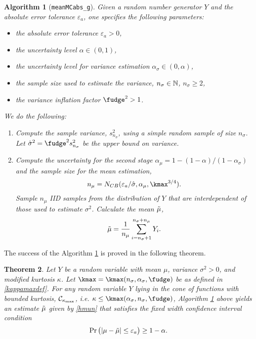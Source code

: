 \documentclass{iitthesis}
\newtheorem{theorem}{Theorem}[section]
\newtheorem{algorithm}[theorem]{Algorithm}
\begin{document}
\begin{algorithm}[{\tt meanMCabs\_g}]\label{meanMCabsg}
Given a random number generator $Y$ and the absolute error tolerance $\varepsilon_a$, one specifies the following parameters:
\begin{itemize}
\item the absolute error tolerance $\varepsilon_a >0$,
\item the uncertainty level $\alpha \in (0,1)$,
\item the uncertainty level for variance estimation $\alpha_\sigma \in (0,\alpha)$,
\item the sample size used to estimate the variance, $n_{\sigma} \in \mathbb{N}$, $n_{\sigma} \geq 2$,
\item the variance inflation factor $\fudge^2 >1$.
\end{itemize}
We do the following:
\begin{enumerate}
\item Compute the sample variance, $s^2_{n_{\sigma}}$, using a simple random sample of size $n_\sigma$. Let $\hsigma^2 = \fudge^2 s^2_{n_\sigma}$ be the upper bound on variance.
\item Compute the uncertainty for the second stage $\alpha_\mu = 1-(1-\alpha)/(1-\alpha_{\sigma})$ and the sample size for the mean estimation,
\begin{align}\label{NCBmeanMCabs}
n_\mu = N_{CB} (\varepsilon_a/\hsigma,\alpha_\mu, \kmax^{3/4}).
\end{align}
Sample $n_\mu$ IID samples from the distribution of $Y$ that are interdependent of those used to estimate $\sigma^2$. Calculate the mean $\tilde{\mu}$,
\begin{align}\label{hmun}
\tilde{\mu} = \frac{1}{n_\mu}\sum_{i = n_\sigma+1}^{n_\sigma+n_\mu}Y_i.
\end{align}
\end{enumerate}
\end{algorithm}
The success of the Algorithm \ref{meanMCabsg} is proved in the following theorem.
\begin{theorem}\label{thm:meanMCabsg}
Let $Y$ be a random variable with mean $\mu$, variance $\sigma^2 >0$, and modified kurtosis $\kappa$. Let $\kmax=\kmax(n_\sigma,\alpha_\sigma,\fudge)$ be as defined in \eqref{kappamaxdef}. For any random variable $Y$ lying in the cone of functions with bounded kurtosis, $\mathcal{C}_{\kappa_{\max}}$, i.e.
$\kappa\leq\kmax(\alpha_{\sigma},n_{\sigma},\fudge)$, Algorithm \ref{meanMCabsg} above yields an estimate $\tilde{\mu}$ given by \eqref{hmun} that satisfies the fixed width confidence interval condition
\begin{align}
\Pr\left( \left \lvert \mu-\tilde{\mu} \right \rvert \leq \varepsilon_a \right) \geq 1-\alpha.
\end{align}
\end{theorem}
\end{document}
